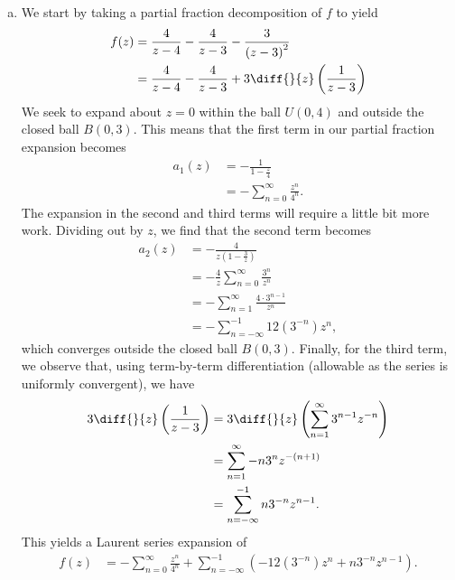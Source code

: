 \documentclass[10pt]{mypackage}
\begin{document}
\begin{solution}\hfill
  \begin{enumerate}[(a)]
    \item We start by taking a partial fraction decomposition of $f$ to yield
      \begin{align*}
        f(z) &= \frac{4}{z-4} - \frac{4}{z-3} -\frac{3}{\left( z-3 \right)^2}\\
             &= \frac{4}{z-4} - \frac{4}{z-3} + 3 \diff{}{z}\left( \frac{1}{z-3} \right) 
      \end{align*}
      We seek to expand about $z = 0$ within the ball $U\left( 0,4 \right)$ and outside the closed ball $B\left( 0,3 \right)$. This means that the first term in our partial fraction expansion becomes
      \begin{align*}
        a_1(z) &= -\frac{1}{1-\frac{z}{4}}\\
               &= -\sum_{n=0}^{\infty} \frac{z^{n}}{4^{n}}.
      \end{align*}
      The expansion in the second and third terms will require a little bit more work. Dividing out by $z$, we find that the second term becomes
      \begin{align*}
        a_2(z) &= -\frac{4}{z\left( 1-\frac{3}{z} \right)}\\
               &= -\frac{4}{z} \sum_{n=0}^{\infty} \frac{3^{n}}{z^{n}}\\
               &= -\sum_{n=1}^{\infty}\frac{4\cdot 3^{n-1}}{z^{n}}\\
               &= -\sum_{n=-\infty}^{-1}12\left( 3^{-n} \right) z^{n},
      \end{align*}
      which converges outside the closed ball $B\left( 0,3 \right)$. Finally, for the third term, we observe that, using term-by-term differentiation (allowable as the series is uniformly convergent), we have
      \begin{align*}
        3\diff{}{z}\left( \frac{1}{z-3} \right) &= 3\diff{}{z}\left( \sum_{n=1}^{\infty} 3^{n-1}z^{-n} \right)\\
                                                &= \sum_{n=1}^{\infty} -n3^{n}z^{-\left( n+1 \right)}\\
                                                &= \sum_{n=-\infty}^{-1} n3^{-n}z^{n-1}.
      \end{align*}
      This yields a Laurent series expansion of
      \begin{align*}
        f(z) &= -\sum_{n=0}^{\infty} \frac{z^{n}}{4^{n}} + \sum_{n=-\infty}^{-1} \left( -12\left( 3^{-n} \right)z^{n} + n3^{-n}z^{n-1} \right).

\end{align*}
\end{enumerate}
\end{solution}
\end{document}

